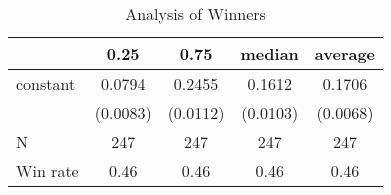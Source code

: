 \begin{table}
\caption{Analysis of Winners}
\begin{center}
\begin{tabular}{lcccc}
\hline
         &   0.25   &   0.75   &  median  & average   \\
\midrule
\midrule
constant & 0.0794   & 0.2455   & 0.1612   & 0.1706    \\
         & (0.0083) & (0.0112) & (0.0103) & (0.0068)  \\
N        & 247      & 247      & 247      & 247       \\
Win rate & 0.46     & 0.46     & 0.46     & 0.46      \\
\hline
\end{tabular}
\end{center}
\end{table}